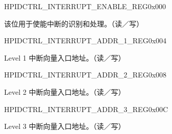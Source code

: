 \begin{register}{H}{PIDCTRL\_INTERRUPT\_ENABLE\_REG}{0x000}\label{regdesc:PIDCTRLINTERRUPTENABLEREG}
    \regnewline%
    \begin{regdesc}\begin{reglist}
    \item [PIDCTRL\_INTERRUPT\_ENABLE]该位用于使能中断的识别和处理。（读／写）
    \end{reglist}\end{regdesc}
    \end{register}
    
    
    \begin{register}{H}{PIDCTRL\_INTERRUPT\_ADDR\_1\_REG}{0x004}\label{regdesc:PIDCTRLINTERRUPTADDR1REG}
    \regnewline%
    \begin{regdesc}\begin{reglist}
    \item [PIDCTRL\_INTERRUPT\_ADDR\_1\_REG] Level 1 中断向量入口地址。（读／写）
    \end{reglist}\end{regdesc}
    \end{register}
    
    
    \begin{register}{H}{PIDCTRL\_INTERRUPT\_ADDR\_2\_REG}{0x008}\label{regdesc:PIDCTRLINTERRUPTADDR2REG}
    \regnewline%
    \begin{regdesc}\begin{reglist}
    \item [PIDCTRL\_INTERRUPT\_ADDR\_2\_REG]Level 2 中断向量入口地址。（读／写）
    \end{reglist}\end{regdesc}
    \end{register}
    
    
    \begin{register}{H}{PIDCTRL\_INTERRUPT\_ADDR\_3\_REG}{0x00C}\label{regdesc:PIDCTRLINTERRUPTADDR3REG}
    \regnewline%
    \begin{regdesc}\begin{reglist}
    \item [PIDCTRL\_INTERRUPT\_ADDR\_3\_REG]Level 3 中断向量入口地址。（读／写）
    \end{reglist}\end{regdesc}
    \end{register}
    
